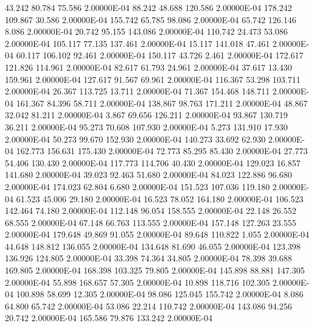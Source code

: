     43.242    80.784    75.586  2.00000E-04
    88.242    48.688   120.586  2.00000E-04
   178.242   109.867    30.586  2.00000E-04
   155.742    65.785    98.086  2.00000E-04
    65.742   126.146     8.086  2.00000E-04
    20.742    95.155   143.086  2.00000E-04
   110.742    24.473    53.086  2.00000E-04
   105.117    77.135   137.461  2.00000E-04
    15.117   141.018    47.461  2.00000E-04
    60.117   106.102    92.461  2.00000E-04
   150.117    43.726     2.461  2.00000E-04
   172.617   121.826   114.961  2.00000E-04
    82.617    61.793    24.961  2.00000E-04
    37.617    13.430   159.961  2.00000E-04
   127.617    91.567    69.961  2.00000E-04
   116.367    53.298   103.711  2.00000E-04
    26.367   113.725    13.711  2.00000E-04
    71.367   154.468   148.711  2.00000E-04
   161.367    84.396    58.711  2.00000E-04
   138.867    98.763   171.211  2.00000E-04
    48.867    32.042    81.211  2.00000E-04
     3.867    69.656   126.211  2.00000E-04
    93.867   130.719    36.211  2.00000E-04
    95.273    70.608   107.930  2.00000E-04
     5.273   131.910    17.930  2.00000E-04
    50.273    99.670   152.930  2.00000E-04
   140.273    33.692    62.930  2.00000E-04
   162.773   156.631   175.430  2.00000E-04
    72.773    85.295    85.430  2.00000E-04
    27.773    54.406   130.430  2.00000E-04
   117.773   114.706    40.430  2.00000E-04
   129.023    16.857   141.680  2.00000E-04
    39.023    92.463    51.680  2.00000E-04
    84.023   122.886    96.680  2.00000E-04
   174.023    62.804     6.680  2.00000E-04
   151.523   107.036   119.180  2.00000E-04
    61.523    45.006    29.180  2.00000E-04
    16.523    78.052   164.180  2.00000E-04
   106.523   142.464    74.180  2.00000E-04
   112.148    96.054   158.555  2.00000E-04
    22.148    26.552    68.555  2.00000E-04
    67.148    66.763   113.555  2.00000E-04
   157.148   127.263    23.555  2.00000E-04
   179.648    49.869    91.055  2.00000E-04
    89.648   110.822     1.055  2.00000E-04
    44.648   148.812   136.055  2.00000E-04
   134.648    81.690    46.055  2.00000E-04
   123.398   136.926   124.805  2.00000E-04
    33.398    74.364    34.805  2.00000E-04
    78.398    39.688   169.805  2.00000E-04
   168.398   103.325    79.805  2.00000E-04
   145.898    88.881   147.305  2.00000E-04
    55.898   168.657    57.305  2.00000E-04
    10.898   118.716   102.305  2.00000E-04
   100.898    58.699    12.305  2.00000E-04
    98.086   125.045   155.742  2.00000E-04
     8.086    64.800    65.742  2.00000E-04
    53.086    22.214   110.742  2.00000E-04
   143.086    94.256    20.742  2.00000E-04
   165.586    79.876   133.242  2.00000E-04
